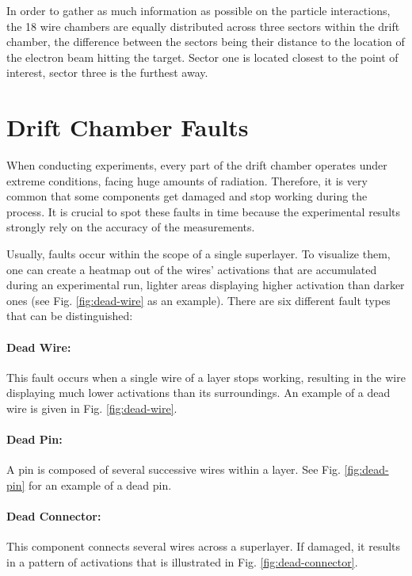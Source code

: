 In order to gather as much information as possible on the particle
interactions, the 18 wire chambers are equally distributed across
three sectors within the drift chamber, the difference between the
sectors being their distance to the location of the electron beam hitting
the target. Sector one is located closest to the point of interest,
sector three is the furthest away.

\section{Drift Chamber Faults}

When conducting experiments, every part of the drift chamber
operates under extreme conditions, facing huge amounts of
radiation. Therefore, it is very common that
some components get damaged and stop working during the process. It
is crucial to spot these faults in time because the experimental
results strongly rely on the accuracy of the measurements.

Usually, faults occur within the scope of a single superlayer. To
visualize them, one can create a heatmap out of the wires' activations
that are accumulated during an experimental run, lighter areas
displaying higher activation than darker ones (see
Fig. \ref{fig:dead-wire} as an example). There are six different fault
types that can be distinguished:

\paragraph{Dead Wire:}
This fault occurs when a single wire
of a layer stops working, resulting in the wire displaying much lower
activations than its surroundings. An example of a dead wire is given
in Fig. \ref{fig:dead-wire}.

\paragraph{Dead Pin:}
A pin is composed of several successive
wires within a layer. See Fig. \ref{fig:dead-pin} for
an example of a dead pin.

\paragraph{Dead Connector:}
This component connects several wires
across a superlayer. If damaged, it results in a pattern of
activations that is illustrated in Fig. \ref{fig:dead-connector}.

